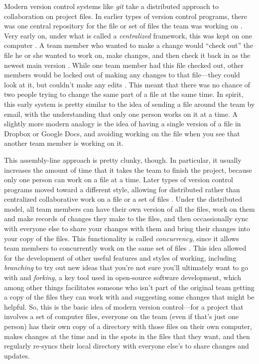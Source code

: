 \documentclass[]{tufte-book}
\begin{document}
Modern version control systems like \emph{git} take a distributed approach to
collaboration on project files. In earlier types of version control programs,
there was one central repository for the file or set of files the team was
working on \citep{raymondunderstanding, target2018version}. Very early on, under
what is called a \emph{centralized} framework, this was kept on one
computer \citep{irving2011astonishments}. A team member who wanted to make a change
would ``check out'' the file he or she wanted to work on, make changes, and then
check it back in as the newest main version \citep{raymond2003art}. While one team
member had this file checked out, other members would be locked out of making
any changes to that file---they could look at it, but couldn't make any edits
\citep{raymondunderstanding, target2018version}. This meant that there was no chance
of two people trying to change the same part of a file at the same time. In
spirit, this early system is pretty similar to the idea of sending a file around
the team by email, with the understanding that only one person works on it at a
time. A slightly more modern analogy is the idea of having a single version of a
file in Dropbox or Google Docs, and avoiding working on the file when you see
that another team member is working on it.

This assembly-line approach is pretty clunky, though. In particular, it usually
increases the amount of time that it takes the team to finish the project,
because only one person can work on a file at a time. Later types of version
control programs moved toward a different style, allowing for distributed rather
than centralized collaborative work on a file or a set of files
\citep{raymondunderstanding, irving2011astonishments}. Under the distributed model,
all team members can have their own version of all the files, work on them and
make records of changes they make to the files, and then occassionally sync with
everyone else to share your changes with them and bring their changes into your
copy of the files. This functionality is called \emph{concurrency}, since it allows
team members to concurrently work on the same set of files
\citep{raymondunderstanding}. This idea allowed for the development of other useful
features and styles of working, including \emph{branching} to try out new ideas that
you're not sure you'll ultimately want to go with and \emph{forking}, a key tool used
in open-source software development, which among other things facilitates
someone who isn't part of the original team getting a copy of the files they can
work with and suggesting some changes that might be helpful. So, this is the
basic idea of modern version control---for a project that involves a set of
computer files, everyone on the team (even if that's just one person) has their
own copy of a directory with those files on their own computer, makes changes at
the time and in the spots in the files that they want, and then regularly
re-syncs their local directory with everyone else's to share changes and
updates.
\end{document}
